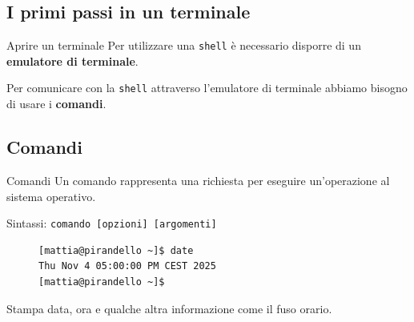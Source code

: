 \subsection{I primi passi in un terminale}
\begin{frame}{Aprire un terminale}
  Per utilizzare una \texttt{shell} è necessario disporre di un \textbf{emulatore di 
  terminale}.\bigskip
  
  Per comunicare con la \texttt{shell} attraverso l'emulatore di terminale
  abbiamo bisogno di usare i \textbf{comandi}.\bigskip
\end{frame}

\subsection{Comandi}
\begin{frame}[fragile]{Comandi}
  Un comando rappresenta una richiesta per eseguire un'operazione al sistema operativo.\bigskip

  Sintassi: \texttt{comando [opzioni] [argomenti]}

  \begin{figure}
    \begin{lstlisting}
[mattia@pirandello ~]$ date
Thu Nov 4 05:00:00 PM CEST 2025
[mattia@pirandello ~]$
    \end{lstlisting}
  \end{figure}
  \begin{flushright}
    \footnotesize
      Stampa data, ora e qualche altra informazione come il fuso orario.
  \end{flushright}
\end{frame}
